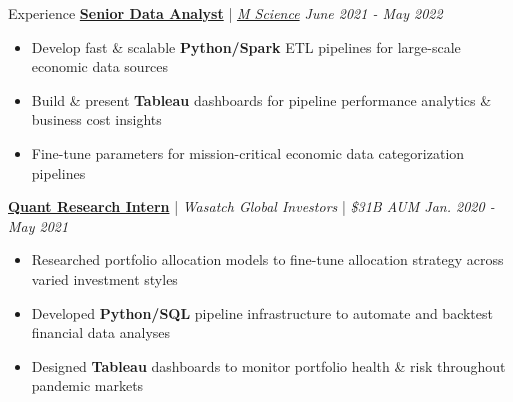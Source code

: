 \documentclass{resume/resume}
\begin{document}
\begin{rSection}{Experience}
  \href{https://mscience.com/}{\bf Senior Data Analyst} | {\em \href{https://mscience.com}{M Science} \hfill June 2021 - May 2022}
  \vspace{-6pt}
  \begin{itemize}[nosep]
    \item Develop fast \& scalable {\bf Python/Spark} ETL pipelines for large-scale economic data sources
    \item Build \& present {\bf Tableau} dashboards for pipeline performance analytics \& business cost insights
    \item Fine-tune parameters for mission-critical economic data categorization pipelines
  \end{itemize}

  \href{https://wasatchglobal.com/}{\bf Quant Research Intern} | {\em Wasatch Global Investors} | {\em \$31B AUM \hfill Jan. 2020 - May 2021}
  \vspace{-6pt}
  \begin{itemize}[nosep]
    \item Researched portfolio allocation models to fine-tune allocation strategy across varied investment styles
    \item Developed {\bf Python/SQL} pipeline infrastructure to automate and backtest financial data analyses
    \item Designed {\bf Tableau} dashboards to monitor portfolio health \& risk throughout pandemic markets
  \end{itemize}


\end{rSection}
\end{document}
